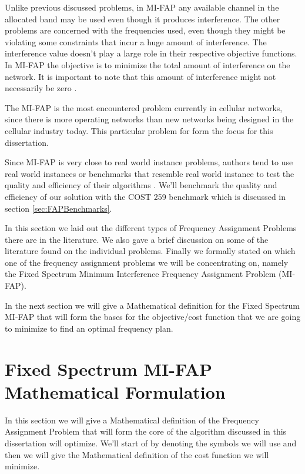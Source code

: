 Unlike previous discussed problems, in MI-FAP any available channel in the allocated band may be used even though it produces interference. The other problems are concerned with the frequencies used, even though they might be violating some constraints that incur a huge amount of interference. The interference value doesn't play a large role in their respective objective functions. In MI-FAP the objective is to minimize the total amount of interference on the network. It is important to note that this amount of interference might not necessarily be zero \cite{Karen2004,Eisenblatter,MontemanniThesis,MultipleBinaryFAP}.

The MI-FAP is the most encountered problem currently in cellular networks, since there is more operating networks than new networks being designed in the cellular industry today. This particular problem for form the focus for this dissertation. 

Since MI-FAP is very close to real world instance problems, authors tend to use real world instances or benchmarks that resemble real world instance to test the quality and efficiency of their algorithms \cite{Karen2004,Eisenblatter,MontemanniThesis,MultipleBinaryFAP}. We'll benchmark the quality and efficiency of our solution with the COST 259 benchmark which is discussed in section \ref{sec:FAPBenchmarks}.

In this section we laid out the different types of Frequency Assignment Problems there are in the literature. We also gave a brief discussion on some of the literature found on the individual problems. Finally we formally stated on which one of the frequency assignment problems we will be concentrating on, namely the Fixed Spectrum Minimum Interference Frequency Assignment Problem (MI-FAP). 

In the next section we will give a Mathematical definition for the Fixed Spectrum MI-FAP that will form the bases for the objective/cost function that we are going to minimize to find an optimal frequency plan.
\section{Fixed Spectrum MI-FAP Mathematical Formulation}
\label{sec:FAPMathDef}
In this section we will give a Mathematical definition of the Frequency Assignment Problem that will form the core of the algorithm discussed in this dissertation will optimize. We'll start of by denoting the symbols we will use and then we will give the Mathematical definition of the cost function we will minimize.

